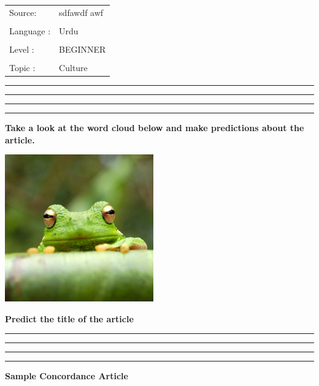 \documentclass[a4paper]{article}
\begin{document}
\pagestyle{fancy}

\renewcommand{\headrulewidth}{0pt}
\lhead{}
\chead{}
\rhead{}
\cfoot{}
\rfoot{}

\begin{table}[!th]
\begin{tabular}{l l}
\Large Source: & \Large  sdfawdf awf \\
\\
\Large Language : & \Large  Urdu \\
\\
\Large Level : & \Large BEGINNER \\
\\
\Large Topic : & \Large Culture \\
\end{tabular}
\label{ex:table}
\end{table}
\hrule\hrule\hrule\hrule\vspace{5mm}
\large \textbf{Take a look at the word cloud below and make predictions about the article.}
\begin{center}
	\includegraphics[width=0.48\textwidth]{frog.jpg}
\end{center}


\textbf{Predict the title of the article}\\
\hrule \vspace{5mm}
\hrule \vspace{5mm}
\hrule \vspace{5mm}
\hrule
\pagebreak

\textbf{Sample Concordance Article}
\\ \vspace{5mm}
\end{document}
